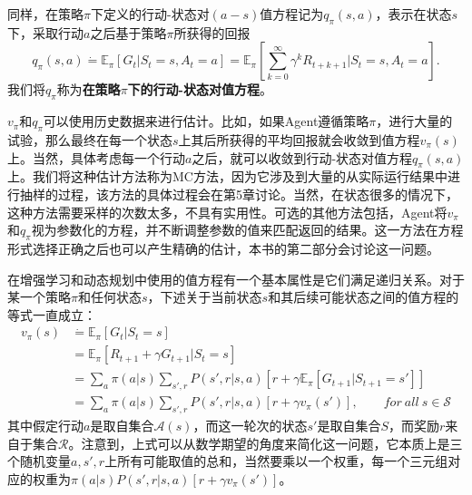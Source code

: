 \documentclass{ctexart}
\begin{document}
            同样，在策略$\pi$下定义的行动-状态对$(a-s)$值方程记为$q_{\pi}(s,a)$，表示在状态$s$下，采取行动$a$之后基于策略$\pi$所获得的回报
            \begin{equation}
                q_{\pi}(s,a) \dot{=} \mathbb{E}_{\pi}[G_t|S_t=s,A_t =a] = \mathbb{E}_{\pi}[\sum_{k=0}^{\infty} \gamma^k R_{t+k+1}|S_t = s,A_t = a].
                \label{e3.13}
            \end{equation}
            我们将$q_{\pi}$称为\textbf{在策略$\pi$下的行动-状态对值方程}。

            $v_{\pi}$和$q_{\pi}$可以使用历史数据来进行估计。比如，如果Agent遵循策略$\pi$，进行大量的试验，那么最终在每一个状态$s$上其后所获得的平均回报就会收敛到值方程$v_{\pi}(s)$上。当然，具体考虑每一个行动$a$之后，就可以收敛到行动-状态对值方程$q_{\pi}(s,a)$上。我们将这种估计方法称为MC方法，因为它涉及到大量的从实际运行结果中进行抽样的过程，该方法的具体过程会在第5章讨论。当然，在状态很多的情况下，这种方法需要采样的次数太多，不具有实用性。可选的其他方法包括，Agent将$v_{\pi}$和$q_{\pi}$视为参数化的方程，并不断调整参数的值来匹配返回的结果。这一方法在方程形式选择正确之后也可以产生精确的估计，本书的第二部分会讨论这一问题。

            在增强学习和动态规划中使用的值方程有一个基本属性是它们满足递归关系。对于某一个策略$\pi$和任何状态$s$，下述关于当前状态$s$和其后续可能状态之间的值方程的等式一直成立：
            \begin{equation}
                \begin{split}
                    v_{\pi} (s) &\dot{=} \mathbb{E}_{\pi}[G_t | S_t = s] \\
                                &= \mathbb{E}_{\pi}[R_{t+1} + \gamma G_{t+1}|S_t=s]\\
                                &= \sum_a \pi(a|s)\sum_{s',r}P(s',r|s,a)[r + \gamma \mathbb{E}_{\pi}[G_{t+1}|S_{t+1}=s']] \\
                                &= \sum_a \pi(a|s)\sum_{s',r}P(s',r|s,a)[r + \gamma v_{\pi}(s')],\qquad for\ all\ s \in \mathcal{S}
                \end{split}
                \label{e3.14}
            \end{equation}
            其中假定行动$a$是取自集合$\mathcal{A}(s)$，而这一轮次的状态$s'$是取自集合$S$，而奖励$r$来自于集合$\mathcal{R}$。注意到，上式可以从数学期望的角度来简化这一问题，它本质上是三个随机变量$a,s',r$上所有可能取值的总和，当然要乘以一个权重，每一个三元组对应的权重为$\pi(a|s)P(s',r|s,a)[r + \gamma v_{\pi}(s')]$。
\end{document}
